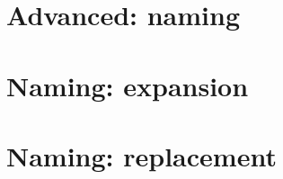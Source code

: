 \section{Advanced: naming}

\newpage
\section{Naming: expansion}

\newpage
\section{Naming: replacement}

% 


